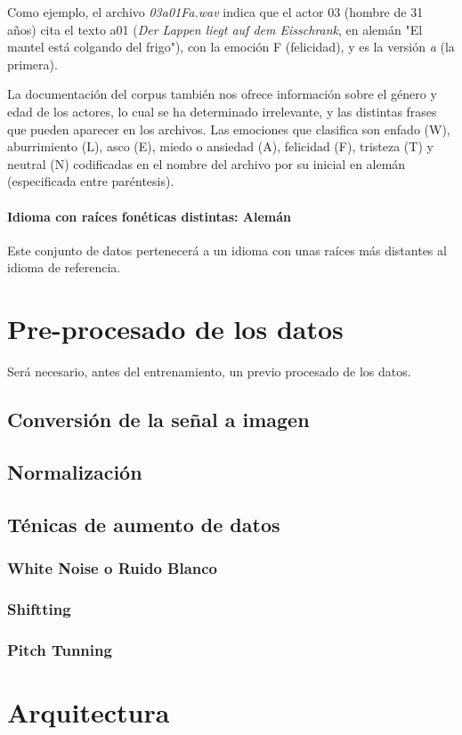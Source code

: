 \documentclass[11pt,a4paper,spanish]{book}
\begin{document}
	Como ejemplo, el archivo \emph{03a01Fa.wav} indica que el actor 03 (hombre de 31 años) cita el texto a01 (\emph{Der Lappen liegt auf dem Eisschrank}, en alemán "El mantel está colgando del frigo"), con la emoción F (felicidad), y es la versión \emph{a} (la primera).
	
	La documentación del corpus también nos ofrece información sobre el género y edad de los actores, lo cual se ha determinado irrelevante, y las distintas frases que pueden aparecer en los archivos.
	Las emociones que clasifica son enfado (W), aburrimiento (L), asco (E), miedo o ansiedad (A), felicidad (F), tristeza (T) y neutral (N) codificadas en el nombre del archivo por su inicial en alemán (especificada entre paréntesis).


	
	\paragraph{Idioma con raíces fonéticas distintas: Alemán} Este conjunto de datos pertenecerá a un idioma con unas raíces más distantes al idioma de referencia.\\
	
	

	\section{Pre-procesado de los datos}
	Será necesario, antes del entrenamiento, un previo procesado de los datos.
	
	\subsection{Conversión de la señal a imagen}
	\subsection{Normalización}
	\subsection{Ténicas de aumento de datos}
		\subsubsection{White Noise o Ruido Blanco}
		\subsubsection{Shiftting}
		\subsubsection{Pitch Tunning}
		
	\section{Arquitectura}
	
		\printbibliography
	
\end{document}
